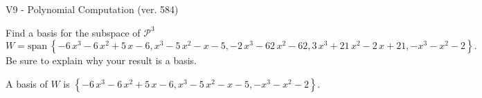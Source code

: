 \begin{exercise}
  \begin{exerciseTitle}V9 - Polynomial Computation (ver. 584)\end{exerciseTitle}
  \begin{exerciseStatement}
    Find a basis for the subspace of \(\mathcal{P}^3\) 
\[W=\mathrm{span}\ \left\{-6 \, x^{3} - 6 \, x^{2} + 5 \, x - 6 , x^{3} - 5 \, x^{2} - x - 5 , -2 \, x^{3} - 62 \, x^{2} - 62 , 3 \, x^{3} + 21 \, x^{2} - 2 \, x + 21 , -x^{3} - x^{2} - 2\right\}.\]
 Be sure to explain why your result is a basis.


  \end{exerciseStatement}
  \begin{exerciseAnswer}
   A basis of \(W\) is  \(\left\{-6 \, x^{3} - 6 \, x^{2} + 5 \, x - 6 , x^{3} - 5 \, x^{2} - x - 5 , -x^{3} - x^{2} - 2\right\}\).
  


  \end{exerciseAnswer}
\end{exercise}